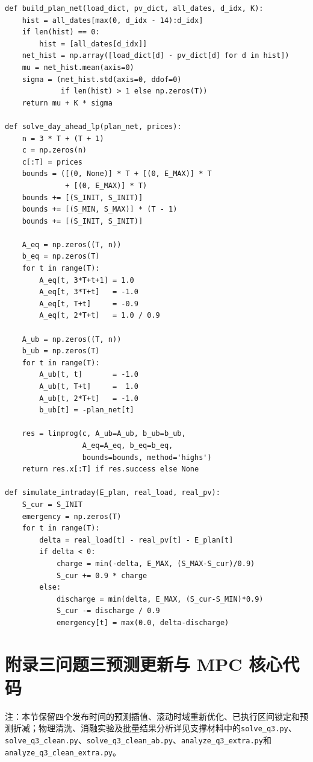 \documentclass{cumcmthesis}
\begin{document}
\begin{lstlisting}[caption={问题二安全净负荷与日前 LP 核心代码节选},label={lst:q2_core}]
def build_plan_net(load_dict, pv_dict, all_dates, d_idx, K):
    hist = all_dates[max(0, d_idx - 14):d_idx]
    if len(hist) == 0:
        hist = [all_dates[d_idx]]
    net_hist = np.array([load_dict[d] - pv_dict[d] for d in hist])
    mu = net_hist.mean(axis=0)
    sigma = (net_hist.std(axis=0, ddof=0)
             if len(hist) > 1 else np.zeros(T))
    return mu + K * sigma

def solve_day_ahead_lp(plan_net, prices):
    n = 3 * T + (T + 1)
    c = np.zeros(n)
    c[:T] = prices
    bounds = ([(0, None)] * T + [(0, E_MAX)] * T
              + [(0, E_MAX)] * T)
    bounds += [(S_INIT, S_INIT)]
    bounds += [(S_MIN, S_MAX)] * (T - 1)
    bounds += [(S_INIT, S_INIT)]

    A_eq = np.zeros((T, n))
    b_eq = np.zeros(T)
    for t in range(T):
        A_eq[t, 3*T+t+1] = 1.0
        A_eq[t, 3*T+t]   = -1.0
        A_eq[t, T+t]     = -0.9
        A_eq[t, 2*T+t]   = 1.0 / 0.9

    A_ub = np.zeros((T, n))
    b_ub = np.zeros(T)
    for t in range(T):
        A_ub[t, t]       = -1.0
        A_ub[t, T+t]     =  1.0
        A_ub[t, 2*T+t]   = -1.0
        b_ub[t] = -plan_net[t]

    res = linprog(c, A_ub=A_ub, b_ub=b_ub,
                  A_eq=A_eq, b_eq=b_eq,
                  bounds=bounds, method='highs')
    return res.x[:T] if res.success else None

def simulate_intraday(E_plan, real_load, real_pv):
    S_cur = S_INIT
    emergency = np.zeros(T)
    for t in range(T):
        delta = real_load[t] - real_pv[t] - E_plan[t]
        if delta < 0:
            charge = min(-delta, E_MAX, (S_MAX-S_cur)/0.9)
            S_cur += 0.9 * charge
        else:
            discharge = min(delta, E_MAX, (S_cur-S_MIN)*0.9)
            S_cur -= discharge / 0.9
            emergency[t] = max(0.0, delta-discharge)
\end{lstlisting}

\section*{附录三\quad 问题三预测更新与 MPC 核心代码}

注：本节保留四个发布时间的预测插值、滚动时域重新优化、已执行区间锁定和预测折减；物理清洗、消融实验及批量结果分析详见支撑材料中的\texttt{solve\_q3.py}、\texttt{solve\_q3\_clean.py}、\texttt{solve\_q3\_clean\_ab.py}、\texttt{analyze\_q3\_extra.py}和\texttt{analyze\_q3\_clean\_extra.py}。
\end{document}
